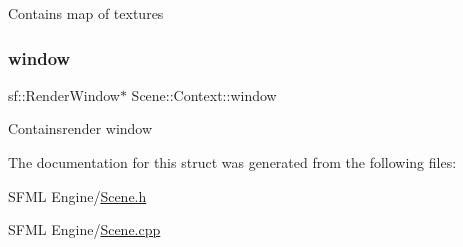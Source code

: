 Contains map of textures \mbox{\label{struct_scene_1_1_context_a4ea0d87e64ed3888a01bfb67e7ac1b84}} 
\subsubsection{\texorpdfstring{window}{window}}
{\footnotesize\ttfamily sf\+::\+Render\+Window$\ast$ Scene\+::\+Context\+::window}

Containsrender window 

The documentation for this struct was generated from the following files\+:\begin{DoxyCompactItemize}
\item 
S\+F\+M\+L Engine/\hyperlink{_scene_8h}{Scene.\+h}\item 
S\+F\+M\+L Engine/\hyperlink{_scene_8cpp}{Scene.\+cpp}\end{DoxyCompactItemize}
